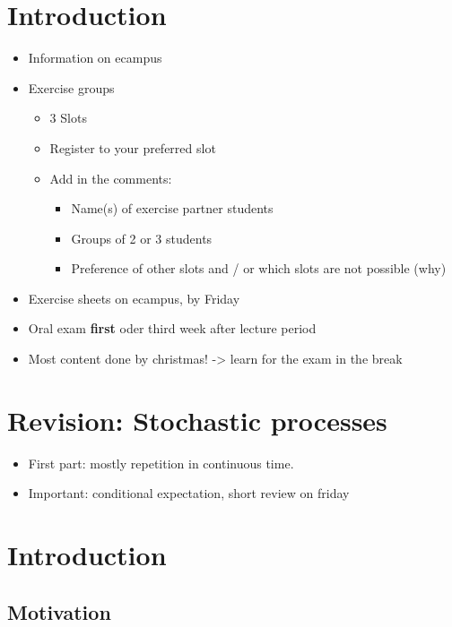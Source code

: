 

\section*{Introduction}

    \begin{itemize}
        \item Information on ecampus
        \item Exercise groups \begin{itemize}
            \item 3 Slots
            \item Register to your preferred slot
            \item Add in the comments: \begin{itemize}
                \item Name(s) of exercise partner students
                \item Groups of 2 or 3 students
                \item Preference of other slots and / or which slots are not possible (why)
            \end{itemize} 
        \end{itemize}
        \item Exercise sheets on ecampus, by Friday
        \item Oral exam \textbf{first} oder third week after lecture period
        \item Most content done by christmas! -> learn for the exam in the break
    \end{itemize}

\section*{Revision: Stochastic processes}

    \begin{itemize}
        \item First part: mostly repetition in continuous time. 
        \item Important: conditional expectation, short review on friday
    \end{itemize}


\section{Introduction}

\subsection{Motivation}

